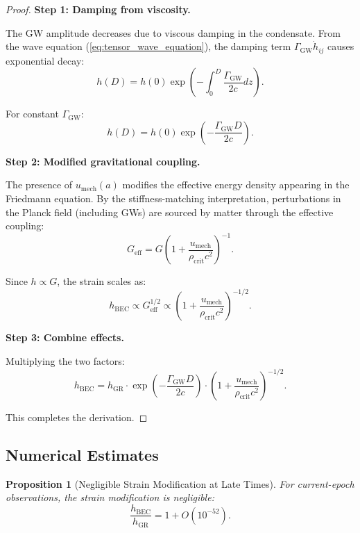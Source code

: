 \documentclass[11pt,a4paper]{article}
\newcommand{\rhocrit}{\ensuremath{\rho_{\mathrm{crit}}}}
\newcommand{\umech}{\ensuremath{u_{\mathrm{mech}}}}
\newtheorem{proposition}[theorem]{Proposition}
\theoremstyle{definition}
\theoremstyle{remark}
\begin{document}
\begin{proof}
\textbf{Step 1: Damping from viscosity.}

The GW amplitude decreases due to viscous damping in the condensate. From the wave equation (\ref{eq:tensor_wave_equation}), the damping term $\Gamma_{\mathrm{GW}}\dot{h}_{ij}$ causes exponential decay:
\begin{equation}
h(D) = h(0)\exp\left(-\int_0^D \frac{\Gamma_{\mathrm{GW}}}{2c}dz\right).
\end{equation}

For constant $\Gamma_{\mathrm{GW}}$:
\begin{equation}
h(D) = h(0)\exp\left(-\frac{\Gamma_{\mathrm{GW}} D}{2c}\right).
\end{equation}

\textbf{Step 2: Modified gravitational coupling.}

The presence of $\umech(a)$ modifies the effective energy density appearing in the Friedmann equation. By the stiffness-matching interpretation, perturbations in the Planck field (including GWs) are sourced by matter through the effective coupling:
\begin{equation}
G_{\mathrm{eff}} = G\left(1 + \frac{\umech}{\rhocrit c^2}\right)^{-1}.
\end{equation}

Since $h \propto G$, the strain scales as:
\begin{equation}
h_{\mathrm{BEC}} \propto G_{\mathrm{eff}}^{1/2} \propto \left(1 + \frac{\umech}{\rhocrit c^2}\right)^{-1/2}.
\end{equation}

\textbf{Step 3: Combine effects.}

Multiplying the two factors:
\begin{equation}
h_{\mathrm{BEC}} = h_{\mathrm{GR}} \cdot \exp\left(-\frac{\Gamma_{\mathrm{GW}} D}{2c}\right) \cdot \left(1 + \frac{\umech}{\rhocrit c^2}\right)^{-1/2}.
\end{equation}

This completes the derivation. \qedhere
\end{proof}

\subsection{Numerical Estimates}
\label{sec:numerical_strain}

\begin{proposition}[Negligible Strain Modification at Late Times]
\label{prop:strain_modification}
For current-epoch observations, the strain modification is negligible:
\begin{equation}
\frac{h_{\mathrm{BEC}}}{h_{\mathrm{GR}}} = 1 + O(10^{-52}).
\end{equation}
\end{proposition}
\end{document}

